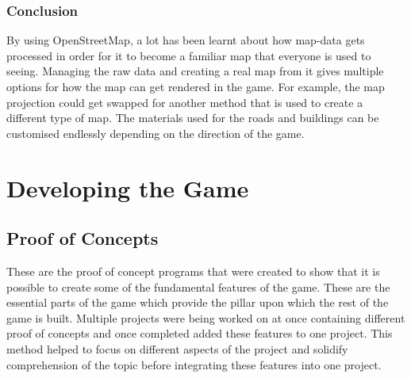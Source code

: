 \documentclass[a4paper]{report}
\begin{document}
\subsection{Conclusion}
By using OpenStreetMap, a lot has been learnt about how map-data gets processed in order for it to become a familiar map that everyone is used to seeing. Managing the raw data and creating a real map from it gives multiple options for how the map can get rendered in the game. For example, the map projection could get swapped for another method that is used to create a different type of map. The materials used for the roads and buildings can be customised endlessly depending on the direction of the game.
\chapter{Developing the Game}
\section{Proof of Concepts}
These are the proof of concept programs that were created to show that it is possible to create some of the fundamental features of the game. These are the essential parts of the game which provide the pillar upon which the rest of the game is built. Multiple projects were being worked on at once containing different proof of concepts and once completed added these features to one project. This method helped to focus on different aspects of the project and solidify comprehension of the topic before integrating these features into one project.
\end{document}

